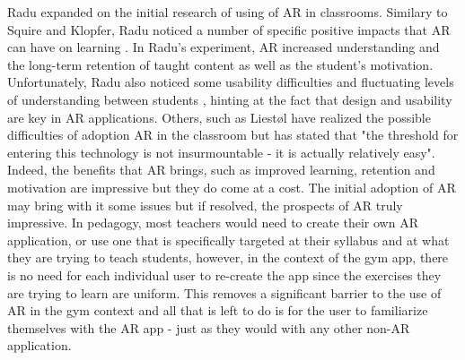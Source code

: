 \documentclass{l4proj}
\begin{document}
Radu expanded on the initial research of using of AR in classrooms. Similary to Squire and Klopfer, Radu noticed a number of specific positive impacts that AR can have on learning \cite{radu_why_2012}. In Radu's experiment, AR increased understanding and the long-term retention of taught content as well as the student's motivation\cite{radu_why_2012}. Unfortunately, Radu also noticed some usability difficulties and fluctuating levels of understanding between students \cite{radu_why_2012}, hinting at the fact that design and usability are key in AR applications. Others, such as Liestøl have realized the possible difficulties of adoption AR in the classroom but has stated that "the threshold for entering this technology is not insurmountable - it is actually relatively easy". Indeed, the benefits that AR brings, such as improved learning, retention and motivation are impressive but they do come at a cost. The initial adoption of AR may bring with it some issues but if resolved, the prospects of AR truly impressive. In  pedagogy, most teachers would need to create their own AR application, or use one that is specifically targeted at their syllabus and at what they are trying to teach students, however, in the context of the gym app, there is no need for each individual user to re-create the app since the exercises they are trying to learn are uniform. This removes a significant barrier to the use of AR in the gym context and all that is left to do is for the user to familiarize themselves with the AR app - just as they would with any other non-AR application. 
\end{document}
